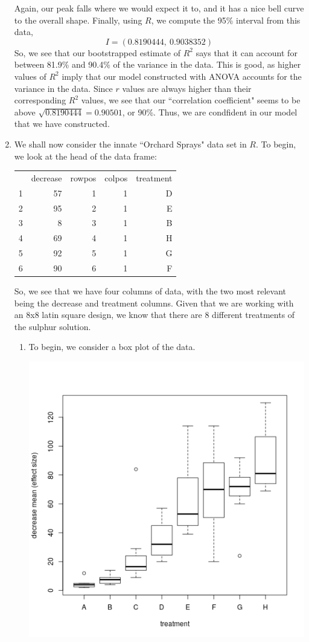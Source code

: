 \documentclass[letterpaper,10pt]{article}
\begin{document}
\begin{enumerate}
\begin{center}
\end{center}
Again, our peak falls where we would expect it to, and it has a nice bell curve to the overall shape. Finally, using $R$, we compute the 95\% interval from this data,
\[I=(0.8190444,\ 0.9038352)\]
So, we see that our bootstrapped estimate of $R^2$ says that it can account for between 81.9\% and 90.4\% of the variance in the data. This is good, as higher values of $R^2$ imply that our model constructed with ANOVA accounts for the variance in the data. Since $r$ values are always higher than their corresponding $R^2$ values, we see that our ``correlation coefficient" seems to be above $\sqrt{0.8190444}=0.90501$, or 90\%. Thus, we are condfident in our model that we have constructed.
\item We shall now consider the innate ``Orchard Sprays" data set in $R$. To begin, we look at the head of the data frame:
\begin{center}
\begin{tabular}{rrrrr}
& decrease & rowpos & colpos & treatment\\
1 & 57 & 1 & 1 & D\\
2 & 95 & 2 & 1 & E\\
3 & 8 & 3 & 1 & B\\
4 & 69 & 4 & 1 & H\\
5 & 92 & 5 & 1 & G\\
6 & 90 & 6 & 1 & F
\end{tabular}
\end{center}
So, we see that we have four columns of data, with the two most relevant being the decrease and treatment columns. Given that we are working with an 8x8 latin square design, we know that there are 8 different treatments of the sulphur solution.
\begin{enumerate}
\item To begin, we consider a box plot of the data.
\begin{center}
\includegraphics[scale=.65]{5box.png}

\end{center}
\end{enumerate}
\end{enumerate}
\end{document}
